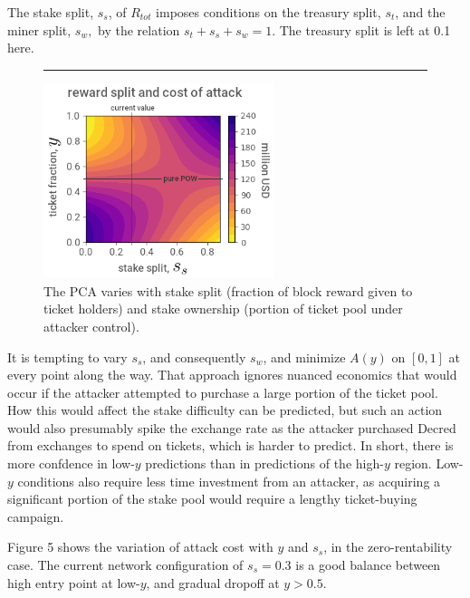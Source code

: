 \documentclass[a4paper,12pt]{article}
\begin{document}
The stake split, $ s_s $, of $ R_{tot} $ imposes conditions on the treasury split, $ s_t $, and the miner split, $ s_w, $ by the relation $ s_t + s_s + s_w = 1 $. The treasury split is left at 0.1 here. 
%
\begin{figure}[b!]
\vspace{5pt}
\hrule
\vspace{10pt}
	\begin{center}
	\includegraphics[width=0.60\textwidth]{stakesplit}
\begin{minipage}[t]{0.85\textwidth}
	\caption{The PCA varies with stake split (fraction of block reward given to ticket holders) and stake ownership (portion of ticket pool under attacker control).}
	\end{minipage}
  	\end{center}
\vspace{-15pt}
\end{figure}
%
It is tempting to vary $ s_s $, and consequently $ s_w $, and minimize $ A(y) $ on $ [ 0, 1 ] $ at every point along the way. That approach ignores nuanced economics that would occur if the attacker attempted to purchase a large portion of the ticket pool. How this would affect the stake difficulty can be predicted, but such an action would also presumably spike the exchange rate as the attacker purchased Decred from exchanges to spend on tickets, which is harder to predict. In short, there is more confdence in low-$ y $ predictions than in predictions of the high-$ y $ region. Low-$ y $ conditions also require less time investment from an attacker, as acquiring a significant portion of the stake pool would require a lengthy ticket-buying campaign. 

Figure 5 shows the variation of attack cost with $ y $ and $ s_s $, in the zero-rentability case. The current network configuration of $ s_s = 0.3 $ is a good balance between high entry point at low-$y$, and gradual dropoff at $y > 0.5$. 
\end{document}
